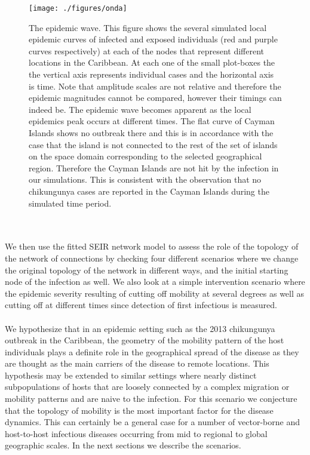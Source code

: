 \documentclass[10pt,a4paper]{article}
\begin{document}
\begin{figure}[ht]
\centering
\texttt{[image: ./figures/onda]}
\caption{\small The epidemic wave. %
This figure shows the several simulated local epidemic curves of infected and exposed individuals (red and purple curves respectively) at each of the nodes that represent different locations in the Caribbean. At each one of the small plot-boxes the the vertical axis represents individual cases and the horizontal axis is time. Note that amplitude scales are not relative and therefore the epidemic magnitudes cannot be compared, however their timings can indeed be. The epidemic wave becomes apparent as the local epidemics peak occurs at different times. The flat curve of Cayman Islands shows no outbreak there and this is in accordance with the case that the island is not connected to the rest of the set of islands on the space domain corresponding to the selected geographical region. Therefore the Cayman Islands are not hit by the infection in our simulations. This is consistent with the observation that no chikungunya cases are reported in the Cayman Islands during the simulated time period.}  
\label{fig:wave}
\end{figure}
%
\\\\
We then use the fitted SEIR network model to assess the role of the topology of the network of connections by checking four different scenarios where we change the original topology of the network in different ways, and the initial starting node of the infection as well. We also look at a simple intervention scenario where the epidemic severity resulting of cutting off mobility at several degrees as well as cutting off at different times since detection of first infectious is measured.   
%
\\\\
We hypothesize that in an epidemic setting such as the 2013 chikungunya outbreak in the Caribbean, the geometry of the mobility pattern of the host individuals plays a definite role in the geographical spread of the disease as they are thought as the main carriers of the disease to remote locations. This hypothesis may be extended to similar settings where nearly distinct subpopulations of hosts that are loosely connected by a complex migration or mobility patterns and are naive to the infection. For this scenario we conjecture that the topology of mobility is the most important factor for the disease dynamics. This can certainly be a general case for a number of vector-borne and host-to-host infectious diseases occurring from mid to regional to global geographic scales. %
In the next sections we describe the scenarios.
%
\end{document}
